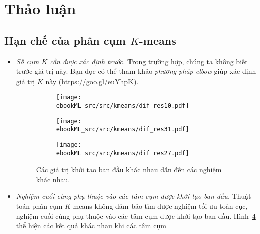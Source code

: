 \section{Thảo luận}
\subsection{Hạn chế của phân cụm $K$-means}


\begin{itemize}
    \item \textit{Số cụm $K$ cần được xác định trước.}
    Trong trường hợp, chúng ta không biết trước giá trị này. Bạn đọc có thể tham khảo \textit{phương pháp elbow} giúp xác định giá trị $K$ này (\url{https://goo.gl/euYhpK}).
    \begin{figure}[t]
        \begin{subfigure}{0.325\textwidth}
        \texttt{[image: ebookML\_src/src/kmeans/dif\_res10.pdf]}
        \caption{}
        \label{fig:4_dif_resa}
        \end{subfigure}
        \begin{subfigure}{0.325\textwidth}
        \texttt{[image: ebookML\_src/src/kmeans/dif\_res31.pdf]}
        \caption{}
        \label{fig:4_dif_resb}
        \end{subfigure}
        \begin{subfigure}{0.325\textwidth}
        \texttt{[image: ebookML\_src/src/kmeans/dif\_res27.pdf]}
        \caption{}
        \label{fig:4_dif_resc}
        \end{subfigure}
        \caption{
        Các giá trị khởi tạo ban đầu khác nhau dẫn đến các nghiệm khác nhau. 
        }
        \label{fig:4_dif_res}
    \end{figure}
    \item \textit{Nghiệm cuối cùng phụ thuộc vào các tâm cụm được khởi tạo ban
    đầu.}
    Thuật toán phân cụm $K$-means không đảm bảo tìm được nghiệm tối ưu toàn cục, nghiệm cuối cùng phụ thuộc vào các tâm cụm được khởi tạo ban đầu.
    Hình~\ref{fig:4_dif_res} thể hiện các kết quả khác nhau khi các tâm cụm

\end{itemize}

